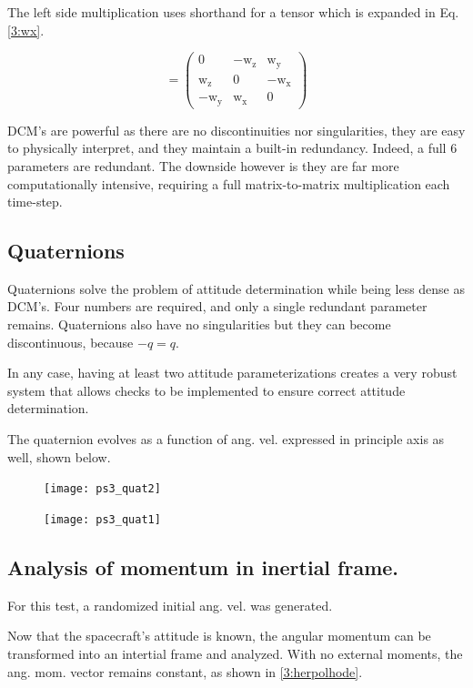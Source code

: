 \documentclass[12pt, letterpaper]{article}
\begin{document}
The left side multiplication uses shorthand for a tensor which is expanded in Eq. \ref{3:wx}.

\begin{equation}
[\omega x]=\left(\begin{array}{ccc} 0 & - \mathrm{w_z} & \mathrm{w_y}\\ \mathrm{w_z} & 0 & - \mathrm{w_x}\\ - \mathrm{w_y} & \mathrm{w_x} & 0 \end{array}\right)
\label{3:wx}
\end{equation}

DCM's are powerful as there are no discontinuities nor singularities, they are easy to physically interpret, and they maintain a built-in redundancy. Indeed, a full 6 parameters are redundant. The downside however is they are far more computationally intensive, requiring a full matrix-to-matrix multiplication each time-step.

\subsection{Quaternions}
Quaternions solve the problem of attitude determination while being less dense as DCM's. Four numbers are required, and only a single redundant parameter remains. Quaternions also have no singularities but they can become discontinuous, because $-q=q$.

In any case, having at least two attitude parameterizations creates a very robust system that allows checks to be implemented to ensure correct attitude determination.

The quaternion evolves as a function of ang. vel. expressed in principle axis as well, shown below.

\begin{figure}[H]
	\centering
	\texttt{[image: ps3\_quat2]}
\end{figure}

\begin{figure}[H]
	\centering
	\texttt{[image: ps3\_quat1]}
\end{figure}


\subsection{Analysis of momentum in inertial frame.}

For this test, a randomized initial ang. vel. was generated.

Now that the spacecraft's attitude is known, the angular momentum can be transformed into an intertial frame and analyzed. With no external moments, the ang. mom. vector remains constant, as shown in \ref{3:herpolhode}. 
\end{document}

